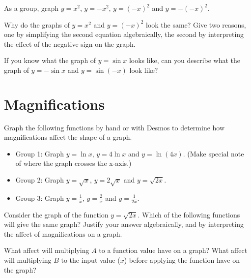 \documentclass[number]{ximera}
\begin{document}
\begin{problem}
As a group, graph $y = x^2$, $y = -x^2$, $y = (-x)^2$ and $y = -(-x)^2$.
\end{problem}

\begin{question}
Why do the graphs of $y = x^2$ and $y = (-x)^2$ look the same? Give two reasons, one by simplifying the second equation algebraically, the second by interpreting the effect of the negative sign on the graph.
\end{question}

\begin{question}
If you know what the graph of $y = \sin x$ looks like, can you describe what the graph of $y = - \sin x$ and $y = \sin (-x)$ look like?
\end{question}


\section{Magnifications}

\begin{problem}
Graph the following functions by hand or with Desmos to determine how magnifications affect the shape of a graph.
\begin{itemize}
\item Group 1: Graph $y = \ln x$, $y = 4 \ln x$ and $y = \ln {(4x)}$. (Make special note of where the graph crosses the x-axis.)
\item Group 2: Graph $y = \sqrt x$, $y = 2 \sqrt x$ and $y = \sqrt {2x}$.
\item Group 3: Graph $y = \frac{1}{x}$, $y = \frac{2}{x}$ and $y = \frac{1}{2x}$. 
\end{itemize}
\end{problem}

\begin{question}
Consider the graph of the function $y=\sqrt{2x}$. Which of the following functions will give the same graph? Justify your answer algebraically, and by interpreting the affect of magnifications on a graph.
\begin{multipleChoice}
\end{multipleChoice}
\end{question}


\begin{question}
What affect will multiplying $A$ to a function value have on a graph? What affect will multiplying $B$ to the input value ($x$) before applying the function have on the graph?
\end{question}
\end{document}
